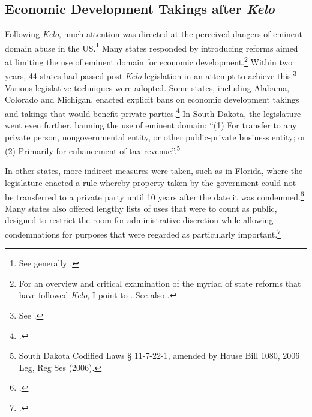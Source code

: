 \subsection{Economic Development Takings after {\it Kelo}}\label{sec:postkelo}

Following {\it Kelo}, much attention was directed at the perceived dangers of eminent domain abuse in the US.\footnote{See generally \cite{somin09}.} %
Many states responded by introducing reforms aimed at limiting the use of eminent domain for economic development.\footnote{For an overview and critical examination of the myriad of state reforms that have followed {\it Kelo}, I point to \cite{eagle08}. See also \cite{somin09}.} Within two years, 44 states had passed post-{\it Kelo} legislation in an attempt to achieve this.\footnote{See \cite{castle}.} Various legislative techniques were adopted. Some states, including Alabama, Colorado and Michigan, enacted explicit bans on economic development takings and takings that would benefit private parties.\footcite[See][107-108]{eagle08} In South Dakota, the legislature went even further, banning the use of eminent domain: ``(1) For transfer to any private person, nongovernmental entity, or other public-private business entity; or (2) Primarily for enhancement of tax revenue''.\footnote{South Dakota Codified Laws § 11-7-22-1, amended by House Bill 1080, 2006 Leg, Reg Ses (2006).}

In other states, more indirect measures were taken, such as in Florida, where the legislature enacted a rule whereby property taken by the government could not be transferred to a private party until 10 years after the date it was condemned.\footcite[809]{eagle08} Many states also offered lengthy lists of uses that were to count as public, designed to restrict the room for administrative discretion while allowing condemnations for purposes that were regarded as particularly important.\footcite[804]{eagle08}

